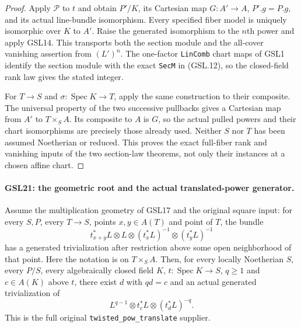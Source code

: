 \begin{proof}
Apply $\mathcal P$ to $t$ and obtain $P'/K$, its Cartesian
map $G:A'\to A$, $P'.g=P.g$, and its actual line-bundle
isomorphism.  Every specified fiber model is uniquely
isomorphic over $K$ to $A'$.  Raise the generated isomorphism
to the $n$th power and apply GSL14.  This transports both
the section module and the all-cover vanishing assertion
from $(L')^n$.  The one-factor \texttt{LinComb} chart maps
of GSL1 identify the section module with the exact
\texttt{SecM} in (GSL.12), so the closed-field rank law gives
the stated integer.

For $T\to S$ and $\sigma:\operatorname{Spec}K\to T$, apply
the same construction to their composite.  The universal
property of the two successive pullbacks gives a Cartesian
map from $A'$ to $T\times_S A$.  Its composite to $A$ is
$G$, so the actual pulled powers and their chart isomorphisms
are precisely those already used.  Neither $S$ nor $T$ has
been assumed Noetherian or reduced.  This proves the exact
full-fiber rank and vanishing inputs of the two section-law
theorems, not only their instances at a chosen affine chart.
\end{proof}

\paragraph{GSL21: the geometric root and the actual translated-power generator.}
\label{claim:GSL21}
Assume the multiplication geometry of GSL17 and the original
square input: for every $S,P$, every $T\to S$, points $x,y\in A(T)$
and point of $T$, the bundle
\[
 t_{x+y}^*L\otimes L\otimes(t_x^*L)^{-1}
                    \otimes(t_y^*L)^{-1}
 \tag{GSL.13}
\]
has a generated trivialization after restriction above some open
neighborhood of that point.  Here the notation is on $T\times_S A$.
Then, for every locally Noetherian $S$, every $P/S$, every
algebraically closed field $K$, $t:\operatorname{Spec}K\to S$,
$q\ge1$ and $c\in A(K)$ above $t$, there exist $d$ with $qd=c$
and an actual generated trivialization of
\[
 L^{q-1}\otimes t_c^*L\otimes(t_d^*L)^{-q}. \tag{GSL.14}
\]
This is the full original \texttt{twisted\_pow\_translate} supplier.

